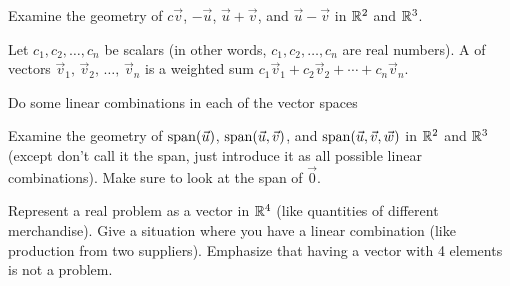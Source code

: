 \begin{problemtodo}
  Examine the geometry of $c\vec v$, $-\vec u$, $\vec u + \vec v$, and $\vec
  u-\vec v$ in $\mathbb{R}^2$ and $\mathbb{R}^3$.
\end{problemtodo}


\begin{definition}
  Let $c_1,c_2,\ldots,c_n$ be scalars (in other words,
  $c_1,c_2,\ldots,c_n$ are real numbers).  A  of vectors $\vec v_1,\, \vec v_2,\, \ldots,\, \vec
  v_n$ is a weighted sum $c_1\vec v_1+c_2\vec v_2+\cdots+c_n\vec v_n$.
\end{definition}

\begin{problemtodo}
  Do some linear combinations in each of the vector spaces
\end{problemtodo}

\begin{problemtodo}\label{prob:geometric spans in Rn}
  Examine the geometry of $\operatorname{span}(\vec u)$, $\operatorname{span}(\vec u, \vec v)$,
  and $\operatorname{span}(\vec u, \vec v, \vec w)$ in $\mathbb{R}^2$ and
  $\mathbb{R}^3$ (except don't call it the span, just introduce it as all
  possible linear combinations).  Make sure to look at the span of
  $\vec 0$.
\end{problemtodo}

\begin{problemtodo}
  Represent a real problem as a vector in $\mathbb{R}^4$ (like quantities of
  different merchandise).  Give a situation where you have a linear
  combination (like production from two suppliers).  Emphasize that
  having a vector with 4 elements is not a problem.
\end{problemtodo}

